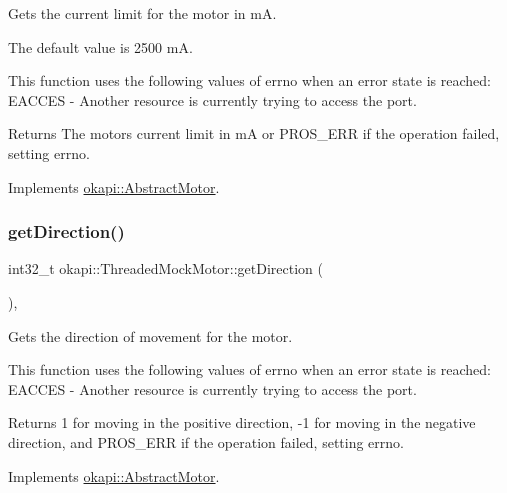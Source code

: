 Gets the current limit for the motor in mA. 

The default value is 2500 mA.

This function uses the following values of errno when an error state is reached\+: E\+A\+C\+C\+ES -\/ Another resource is currently trying to access the port.

\begin{DoxyReturn}{Returns}
The motor\textquotesingle{}s current limit in mA or P\+R\+O\+S\+\_\+\+E\+RR if the operation failed, setting errno. 
\end{DoxyReturn}


Implements \mbox{\hyperlink{classokapi_1_1AbstractMotor_ab83ef3319ffe1cb1d020e5a10127aab8}{okapi\+::\+Abstract\+Motor}}.

\mbox{\label{classokapi_1_1ThreadedMockMotor_a06b43dc9e16e3e67b48d1fcb339128fb}} 
\subsubsection{\texorpdfstring{getDirection()}{getDirection()}}
{\footnotesize\ttfamily int32\+\_\+t okapi\+::\+Threaded\+Mock\+Motor\+::get\+Direction (\begin{DoxyParamCaption}{ }\end{DoxyParamCaption})\hspace{0.3cm}{\ttfamily [override]}, {\ttfamily [virtual]}}



Gets the direction of movement for the motor. 

This function uses the following values of errno when an error state is reached\+: E\+A\+C\+C\+ES -\/ Another resource is currently trying to access the port.

\begin{DoxyReturn}{Returns}
1 for moving in the positive direction, -\/1 for moving in the negative direction, and P\+R\+O\+S\+\_\+\+E\+RR if the operation failed, setting errno. 
\end{DoxyReturn}


Implements \mbox{\hyperlink{classokapi_1_1AbstractMotor_a94763d1700bd91b995333b012c0b683f}{okapi\+::\+Abstract\+Motor}}.

\mbox{\label{classokapi_1_1ThreadedMockMotor_a09b93e115fc65434403ae220de5e5e22}} 
